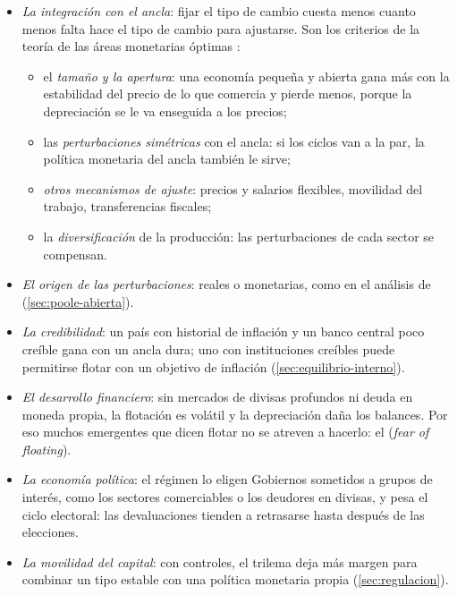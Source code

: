 \documentclass[11pt]{article}
\begin{document}
\begin{itemize}
\item \emph{La integración con el ancla}: fijar el tipo de cambio cuesta menos cuanto menos falta hace el tipo de cambio para ajustarse. Son los criterios de la teoría de las áreas monetarias óptimas\nocite{Mundell1961Theory,McKinnon1963Optimum,Kenen1969Theory} :
  \begin{itemize}
  \item el \emph{tamaño y la apertura}: una economía pequeña y abierta gana más con la estabilidad del precio de lo que comercia y pierde menos, porque la depreciación se le va enseguida a los precios;
  \item las \emph{perturbaciones simétricas} con el ancla: si los ciclos van a la par, la política monetaria del ancla también le sirve;
  \item \emph{otros mecanismos de ajuste}: precios y salarios flexibles, movilidad del trabajo, transferencias fiscales;
  \item la \emph{diversificación} de la producción: las perturbaciones de cada sector se compensan.
  \end{itemize}
\item \emph{El origen de las perturbaciones}: reales o monetarias, como en el análisis de  (\ref{sec:poole-abierta}).
\item \emph{La credibilidad}: un país con historial de inflación y un banco central poco creíble gana con un ancla dura; uno con instituciones creíbles puede permitirse flotar con un objetivo de inflación (\ref{sec:equilibrio-interno}).
\item \emph{El desarrollo financiero}: sin mercados de divisas profundos ni deuda en moneda propia, la flotación es volátil y la depreciación daña los balances. Por eso muchos emergentes que dicen flotar no se atreven a hacerlo: el  (\emph{fear of floating})\nocite{CalvoReinhart2002}.
\item \emph{La economía política}: el régimen lo eligen Gobiernos sometidos a grupos de interés, como los sectores comerciables o los deudores en divisas, y pesa el ciclo electoral: las devaluaciones tienden a retrasarse hasta después de las elecciones\nocite{Frieden2015Currency}.
\item \emph{La movilidad del capital}: con controles, el trilema deja más margen para combinar un tipo estable con una política monetaria propia (\ref{sec:regulacion}).
\end{itemize}
\end{document}
